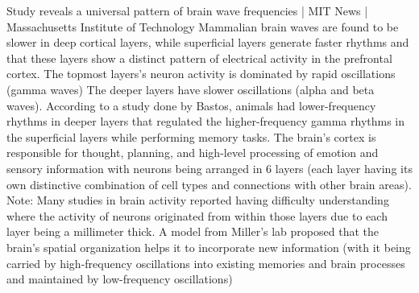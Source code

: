\documentclass{article}
\begin{document}
Study reveals a universal pattern of brain wave frequencies | MIT News | Massachusetts Institute of Technology
Mammalian brain waves are found to be slower in deep cortical layers, while superficial layers generate faster rhythms and that these layers show a distinct pattern of electrical activity in the prefrontal cortex.
The topmost layers’s neuron activity is dominated by rapid oscillations (gamma waves)
The deeper layers have slower oscillations (alpha and beta waves).
According to a study done by Bastos, animals had lower-frequency rhythms in deeper layers that regulated the higher-frequency gamma rhythms in the superficial layers while performing memory tasks.
The brain’s cortex is responsible for thought, planning, and high-level processing of emotion and sensory information with neurons being arranged in 6 layers (each layer having its own distinctive combination of cell types and connections with other brain areas).
Note: Many studies in brain activity reported having difficulty understanding where the activity of neurons originated from within those layers due to each layer being a millimeter thick.
A model from Miller’s lab proposed that the brain’s spatial organization helps it to incorporate new information (with it being carried by high-frequency oscillations into existing memories and brain processes and maintained by low-frequency oscillations)
\end{document}

